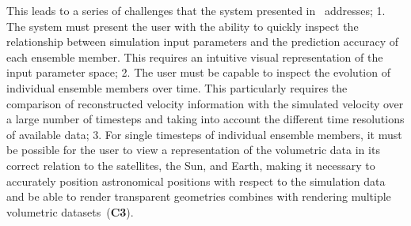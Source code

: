 This leads to a series of challenges that the system presented in \paperCME\ addresses;  1. The system must present the user with the ability to quickly inspect the relationship between simulation input parameters and the prediction accuracy of each ensemble member.  This requires an intuitive visual representation of the  input parameter space;  2. The user must be capable to inspect the evolution of individual ensemble members over time.  This particularly requires the comparison of reconstructed velocity information with the simulated velocity over a large number of timesteps and taking into account the different time resolutions of available data;  3. For single timesteps of individual ensemble members, it must be possible for the user to view a representation of the volumetric data in its correct relation to the satellites, the Sun, and Earth, making it necessary to accurately position astronomical positions with respect to the simulation data and be able to render transparent geometries combines with rendering multiple volumetric datasets~(\textbf{C3}).


